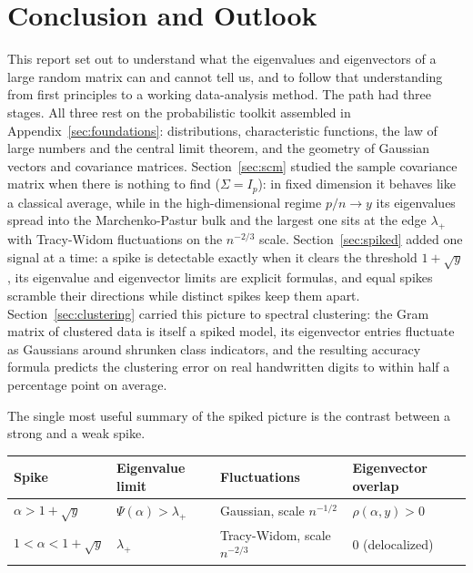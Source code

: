 
\section{Conclusion and Outlook}\label{sec:conclusion}

This report set out to understand what the eigenvalues and eigenvectors of a large random matrix can and cannot tell us, and to follow that understanding from first principles to a working data-analysis method. The path had three stages. All three rest on the probabilistic toolkit assembled in Appendix~\ref{sec:foundations}: distributions, characteristic functions, the law of large numbers and the central limit theorem, and the geometry of Gaussian vectors and covariance matrices. Section~\ref{sec:scm} studied the sample covariance matrix when there is nothing to find (\(\Sigma = I_p\)): in fixed dimension it behaves like a classical average, while in the high-dimensional regime \(p/n \to y\) its eigenvalues spread into the Marchenko-Pastur bulk and the largest one sits at the edge \(\lambda_+\) with Tracy-Widom fluctuations on the \(n^{-2/3}\) scale. Section~\ref{sec:spiked} added one signal at a time: a spike is detectable exactly when it clears the threshold \(1 + \sqrt{y}\), its eigenvalue and eigenvector limits are explicit formulas, and equal spikes scramble their directions while distinct spikes keep them apart. Section~\ref{sec:clustering} carried this picture to spectral clustering: the Gram matrix of clustered data is itself a spiked model, its eigenvector entries fluctuate as Gaussians around shrunken class indicators, and the resulting accuracy formula predicts the clustering error on real handwritten digits to within half a percentage point on average.

The single most useful summary of the spiked picture is the contrast between a strong and a weak spike.

\begin{center}
\begin{tabular}{l l l l}
\hline
Spike & Eigenvalue limit & Fluctuations & Eigenvector overlap \\
\hline
\(\alpha > 1 + \sqrt{y}\) & \(\Psi(\alpha) > \lambda_+\) & Gaussian, scale \(n^{-1/2}\) & \(\rho(\alpha, y) > 0\) \\
\(1 < \alpha < 1 + \sqrt{y}\) & \(\lambda_+\) & Tracy-Widom, scale \(n^{-2/3}\) & \(0\) (delocalized) \\
\hline
\end{tabular}
\end{center}

